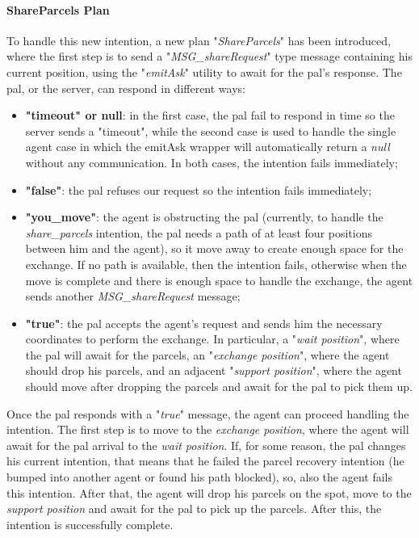                 \paragraph{ShareParcels Plan}
                    To handle this new intention, a new plan "\textit{ShareParcels}" has been introduced, where the first step is to send a "\textit{MSG\_shareRequest}" type message containing his current position, using the "\textit{emitAsk}" utility to await for the pal's response. The pal, or the server, can respond in different ways:
                    \begin{itemize}
                        \item \textbf{"timeout" or null}: in the first case, the pal fail to respond in time so the server sends a "timeout", while the second case is used to handle the single agent case in which the emitAsk wrapper will automatically return a \textit{null} without any communication. In both cases, the intention fails immediately;
                        \item \textbf{"false"}: the pal refuses our request so the intention fails immediately;
                        \item \textbf{"you\_move"}: the agent is obstructing the pal (currently, to handle the \textit{share\_parcels} intention, the pal needs a path of at least four positions between him and the agent), so it move away to create enough space for the exchange. If no path is available, then the intention fails, otherwise when the move is complete and there is enough space to handle the exchange, the agent sends another \textit{MSG\_shareRequest} message;
                        \item \textbf{"true"}: the pal accepts the agent's request and sends him the necessary coordinates to perform the exchange. In particular, a "\textit{wait position}", where the pal will await for the parcels, an "\textit{exchange position}", where the agent should drop his parcels, and an adjacent "\textit{support position}", where the agent should move after dropping the parcels and await for the pal to pick them up.
                    \end{itemize}
                    Once the pal responds with a "\textit{true}" message, the agent can proceed handling the intention. The first step is to move to the \textit{exchange position}, where the agent will await for the pal arrival to the \textit{wait position}. If, for some reason, the pal changes his current intention, that means that he failed the parcel recovery intention (he bumped into another agent or found his path blocked), so, also the agent fails this intention. After that, the agent will drop his parcels on the spot, move to the \textit{support position} and await for the pal to pick up the parcels. After this, the intention is successfully complete.
